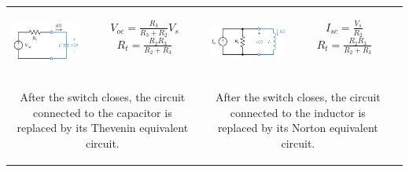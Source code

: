 \documentclass[aspectratio=169]{beamer}
\begin{document}
\begin{frame}[fragile]
\begin{tabular}{cc}
\begin{columns}
\begin{column}{.5\textwidth}
	
\begin{columns}	
	\begin{column}{.4\textwidth}
	\includegraphics[width=3cm,height=1.5cm]{figure7.png}
	\end{column}
	\begin{column}{.4\textwidth}
\tiny $V_{oc}=\frac{R_3}{R_3+R_2}V_s $ 
\newline \newline
\tiny $R_{t}=\frac{R_2R_3}{R_2+R_3}$
	\end{column}
\end{columns}


\center \tiny After the switch closes, the circuit connected to the capacitor is replaced by its Thevenin equivalent circuit.
				
				\end{column}
		
	\begin{column}{.5\textwidth}  %

	\begin{columns}	
	\begin{column}{.4\textwidth}
	\includegraphics[width=3cm,height=1.5cm]{figure9.png}
	\end{column}
	\begin{column}{.4\textwidth}
\tiny $I_{sc}=\frac{V_s}{R_2}$ 
\newline \newline
\tiny $R_{t}=\frac{R_2R_3}{R_2+R_3}$
	\end{column}
\end{columns}
	\center	\tiny After the switch closes, the circuit connected to the inductor is replaced by its Norton equivalent circuit.				
				\end{column}		
		\end{columns}\\		
	\end{tabular}	
	
\end{frame}
\end{document}
